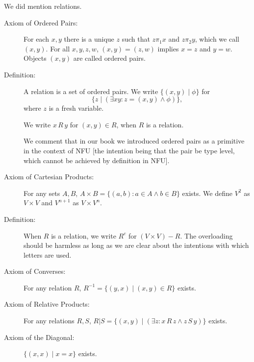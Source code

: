 \documentclass{slides}
\begin{document}
\begin{slide}

We did mention relations.

\begin{description}

\item[Axiom of Ordered Pairs:]  For each $x,y$ there is a unique $z$ such that $z \pi_1 x$ and $z \pi_2 y$, which we
call $(x,y)$.  For all $x,y,z,w$, $(x,y)=(z,w)$ implies $x=z$ and $y=w$. Objects $(x,y)$ are called ordered pairs.

\item[Definition:]  A relation is a set of ordered pairs.  We write $\{(x,y)\mid\phi\}$ for $$\{z\mid (\exists xy:z=(x,y) \wedge \phi)\},$$ where $z$ is a fresh variable.

We write $x \,R\,y$ for $(x,y) \in R$, when $R$ is a relation.

We comment that in our book we introduced ordered pairs as a primitive in the context of NFU [the intention being that the pair be type level, which cannot be achieved by definition in NFU].

\end{description}


\end{slide}
\begin{slide}

\begin{description}

\item[Axiom of Cartesian Products:]  For any sets $A,B$, $A \times B =\{(a,b):a \in A \wedge b \in B\}$ exists.  We define $V^2$ as $V \times V$ and $V^{n+1}$ as $V \times V^n$.

\item[Definition:]  When $R$ is a relation, we write $R^c$ for $(V\times V)-R$.  The overloading should be harmless
as long as we are clear about the intentions with which letters are used.

\item[Axiom of Converses:]  For any relation $R$, $R^{-1} = \{(y,x)\mid (x,y)\in R\}$ exists.

\item[Axiom of Relative Products:]  For any relations $R,S$, $R|S = \{(x,y)\mid (\exists z:x\,R\,z \wedge z\,S\,y)\}$ exists.

\item[Axiom of the Diagonal:]  $\{(x,x)\mid x=x\}$ exists.

\end{description}

\end{slide}
\end{document}
